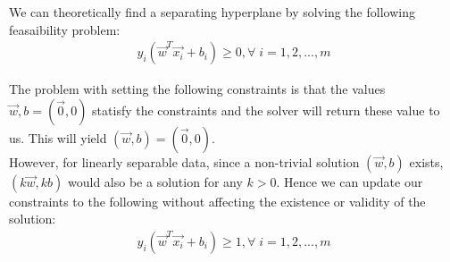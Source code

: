 \documentclass[journal]{IEEEtran}
\begin{document}


We can theoretically find a separating hyperplane by solving the following feasaibility problem:
\begin{align*}
    y_i(\vec{w}^T \vec{x_i} + b_i) \geq 0, \forall \; i = 1, 2, ..., m
\end{align*}

The problem with setting the following constraints is that the values $\vec{w}, b = (\vec{0}, 0) $ statisfy the constraints and the solver will return these value to us. This will yield $(\vec{w}, b) = (\vec{0}, 0) $.\\

However, for linearly separable data, since a non-trivial solution $(\vec{w}, b)$ exists, $(k \vec{w}, k b)$ would also be a solution for any $k > 0$. Hence we can update our constraints to the following without affecting the existence or validity of the solution:
\begin{align*}
    y_i(\vec{w}^T \vec{x_i} + b_i) \geq 1, \forall \; i = 1, 2, ..., m
\end{align*}
\end{document}
